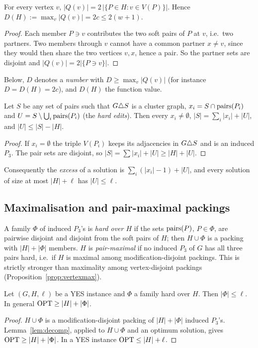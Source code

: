 \begin{lemma}[Degrees]\label{lem:deg}
For every vertex $v$, $|Q(v)|=2\,|\{P\in H:v\in V(P)\}|$. Hence $D(H):=\max_v|Q(v)|=2c\le 2(w+1)$.
\end{lemma}
\begin{proof}
Each member $P\ni v$ contributes the two soft pairs of $P$ at $v$, i.e.\ two partners. Two members through $v$ cannot have a common partner $x\ne v$, since they would then share the two vertices $v,x$, hence a pair. So the partner sets are disjoint and $|Q(v)|=2|\{P\ni v\}|$.
\end{proof}
Below, $D$ denotes a \emph{number} with $D\ge\max_v|Q(v)|$ (for instance $D=D(H)=2c$), and $D(H)$ the function value.

\begin{lemma}\label{lem:decomp}
Let $S$ be any set of pairs such that $G\triangle S$ is a cluster graph, $x_i=S\cap\mathrm{pairs}(P_i)$ and $U=S\setminus\bigcup_i\mathrm{pairs}(P_i)$ (the \emph{hard edits}). Then every $x_i\neq\emptyset$, $|S|=\sum_i|x_i|+|U|$, and $|U|\le|S|-|H|$.
\end{lemma}
\begin{proof}
If $x_i=\emptyset$ the triple $V(P_i)$ keeps its adjacencies in $G\triangle S$ and is an induced $P_3$. The pair sets are disjoint, so $|S|=\sum|x_i|+|U|\ge|H|+|U|$.
\end{proof}
Consequently the \emph{excess} of a solution is $\sum_i(|x_i|-1)+|U|$, and every solution of size at most $|H|+\ell$ has $|U|\le\ell$.

\subsection{Maximalisation and pair-maximal packings}
A family $\Phi$ of induced $P_3$'s is \emph{hard over $H$} if the sets $\mathrm{pairs}(P)$, $P\in\Phi$, are pairwise disjoint and disjoint from the soft pairs of $H$; then $H\cup\Phi$ is a packing with $|H|+|\Phi|$ members. $H$ is \emph{pair-maximal} if no induced $P_3$ of $G$ has all three pairs hard, i.e.\ if $H$ is maximal among modification-disjoint packings. This is strictly stronger than maximality among vertex-disjoint packings (Proposition~\ref{prop:vertexmax}).

\begin{lemma}\label{lem:fam}
Let $(G,H,\ell)$ be a YES instance and $\Phi$ a family hard over $H$. Then $|\Phi|\le\ell$. In general $\mathrm{OPT}\ge|H|+|\Phi|$.
\end{lemma}
\begin{proof}
$H\cup\Phi$ is a modification-disjoint packing of $|H|+|\Phi|$ induced $P_3$'s. Lemma~\ref{lem:decomp}, applied to $H\cup\Phi$ and an optimum solution, gives $\mathrm{OPT}\ge|H|+|\Phi|$. In a YES instance $\mathrm{OPT}\le|H|+\ell$.
\end{proof}

